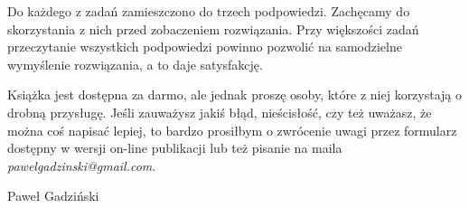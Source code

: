 		\vspace{10px}
		\noindent
		Do każdego z zadań zamieszczono do trzech podpowiedzi. Zachęcamy do skorzystania z nich przed zobaczeniem rozwiązania. Przy większości zadań przeczytanie wszystkich podpowiedzi powinno pozwolić na samodzielne wymyślenie rozwiązania, a to daje satysfakcję.

		\vspace{10px}
		\noindent
		Książka jest dostępna za darmo, ale jednak proszę osoby, które z niej korzystają o drobną przysługę. Jeśli zauważysz jakiś błąd, nieścisłość, czy też uważasz, że można coś napisać lepiej, to bardzo prosiłbym o zwrócenie uwagi przez formularz dostępny w wersji on-line publikacji lub też pisanie na maila \textit{pawelgadzinski@gmail.com}.

		\vspace{10px}
 
		\hspace*{\fill}Paweł Gadziński

\vspace*{\fill}
\newpage